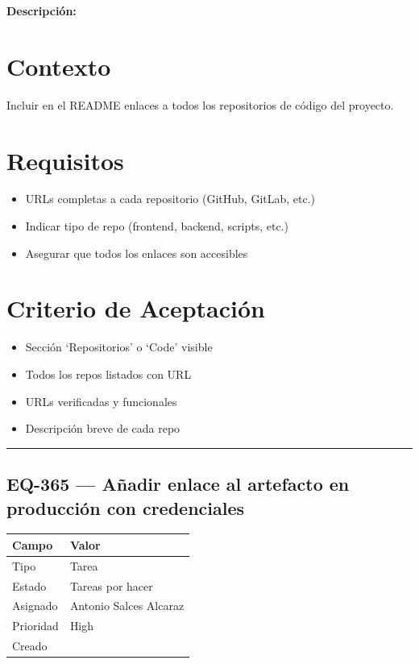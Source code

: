 \documentclass[
  spanish,
  11pt,
]{report}
\newcounter{none} %
\providecommand{\tightlist}{%
  \setlength{\itemsep}{0pt}\setlength{\parskip}{0pt}}
\begin{document}
\textbf{Descripción:}

\section{Contexto}\label{contexto-2}

Incluir en el README enlaces a todos los repositorios de código del
proyecto.

\section{Requisitos}\label{requisitos-1}

\begin{itemize}
\tightlist
\item
  URLs completas a cada repositorio (GitHub, GitLab, etc.)
\item
  Indicar tipo de repo (frontend, backend, scripts, etc.)
\item
  Asegurar que todos los enlaces son accesibles
\end{itemize}

\section{Criterio de Aceptación}\label{criterio-de-aceptaciuxf3n-1}

\begin{itemize}
\tightlist
\item[$\square$]
  Sección `Repositorios' o `Code' visible
\item[$\square$]
  Todos los repos listados con URL
\item[$\square$]
  URLs verificadas y funcionales
\item[$\square$]
  Descripción breve de cada repo
\end{itemize}

\begin{center}\rule{0.5\linewidth}{0.5pt}\end{center}

\subsection{EQ-365 --- Añadir enlace al artefacto en producción con
credenciales}\label{eq-365-auxf1adir-enlace-al-artefacto-en-producciuxf3n-con-credenciales}

{\def\LTcaptype{none} %
\begin{longtable}[]{@{}ll@{}}
\toprule\noalign{}
Campo & Valor \\
\midrule\noalign{}
\endhead
\bottomrule\noalign{}
\endlastfoot
Tipo & Tarea \\
Estado & Tareas por hacer \\
Asignado & Antonio Salces Alcaraz \\
Prioridad & High \\
Creado & \\
\end{longtable}
}
\end{document}
